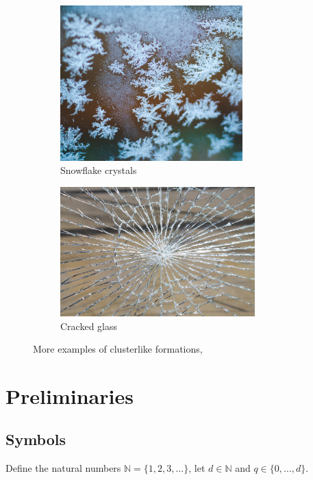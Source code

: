 \documentclass[12pt,a4paper]{scrartcl}
\newcommand{\N}{\mathbb{N}} %
\newcommand{\1}{\mathbbm{1}}
\theoremstyle{definition}
\numberwithin{equation}{section}
\begin{document}
\vspace*{\fill}

\begin{figure}[]
	\centering
	\begin{subfigure}[b]{.45\textwidth}
		\includegraphics[height=6cm]{images/snowflake.png}
		\caption{Snowflake crystals} 
	\end{subfigure}
	\begin{subfigure}[b]{.52\textwidth}
		\includegraphics[height=5cm]{images/glass-break.jpg}
		\caption{Cracked glass} 
	\end{subfigure}
	\caption{More examples of clusterlike formations, \cite{unsplash}}
	\label{other}
\end{figure}




\newpage


\section{Preliminaries} \label{prelim}

\subsection{Symbols} \label{symbols}
Define the natural numbers $\N = \{1,2,3,\dots\}$, let $d\in \N$ and $q\in \{0,\dots,d\}$. 
\end{document}

